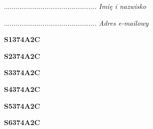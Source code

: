 \begin{turn}{90}\begin{minipage}{\linewidth} \vspace{20mm} ................................................  \textit{Imię i nazwisko}\end{minipage}\end{turn}

\begin{turn}{90}\begin{minipage}{\linewidth} \vspace{20mm} ................................................  \textit{Adres e-mailowy}\end{minipage}\end{turn}

\begin{turn}{90}\huge \begin{minipage}{\linewidth} \vspace{10mm}\textbf{S1374A2C}\end{minipage}\end{turn}

\begin{turn}{90}\huge \begin{minipage}{\linewidth} \vspace{10mm}\textbf{S2374A2C}\end{minipage}\end{turn}

\begin{turn}{90}\huge \begin{minipage}{\linewidth} \vspace{10mm}\textbf{S3374A2C}\end{minipage}\end{turn}

\begin{turn}{90}\huge \begin{minipage}{\linewidth} \vspace{10mm}\textbf{S4374A2C}\end{minipage}\end{turn}

\begin{turn}{90}\huge \begin{minipage}{\linewidth} \vspace{10mm}\textbf{S5374A2C}\end{minipage}\end{turn}

\begin{turn}{90}\huge \begin{minipage}{\linewidth} \vspace{10mm}\textbf{S6374A2C}\end{minipage}\end{turn}

